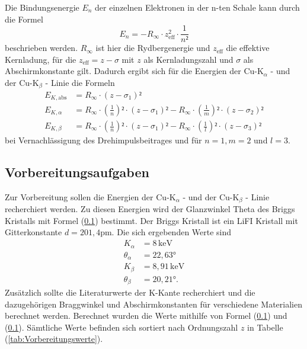 Die Bindungsenergie $E_n$ der einzelnen Elektronen in der n-ten Schale kann durch die Formel 
\begin{equation}
E_n = - R_{\infty} \cdot z^{2}_{\text{eff}} \cdot \frac{1}{n²}
\end{equation}
beschrieben werden. $R_{\infty}$ ist hier die Rydbergenergie und $z_{\text{eff}}$ die effektive Kernladung, für die $z_{\text{eff}} = z - \sigma$ mit $z$ als Kernladungszahl 
und $\sigma$ als Abschirmkonstante gilt. 
Dadurch ergibt sich für die Energien der $\text{Cu-K}_\alpha$ - und der $\text{Cu-K}_{\beta}$ - Linie die Formeln 
\begin{align}
    E_{K,\text{abs}} &= R_{\infty} \cdot \left(z - \sigma_1\right)² \label{eqn:Kupfer_Linien_Energien_abs} \\
    E_{K,\alpha} &= R_{\infty} \cdot \left(\frac{1}{n}\right)² \cdot \left(z - \sigma_1\right)² - R_{\infty} \cdot \left(\frac{1}{m}\right)² \cdot \left(z - \sigma_2\right)² \label{eqn:Kupfer_Linien_Energien_alpha}\\
    E_{K,\beta} &= R_{\infty} \cdot \left(\frac{1}{n}\right)² \cdot \left(z - \sigma_1\right)² - R_{\infty} \cdot \left(\frac{1}{l}\right)² \cdot \left(z - \sigma_3\right)² \label{eqn:Kupfer_Linien_Energien_beta}
 \end{align}
bei Vernachlässigung des Drehimpulsbeitrages und für $n = 1, m = 2$ und $l = 3$. 
\subsection{}

\subsection{Vorbereitungsaufgaben}
\label{sec:Vorbereitungsaufgaben}
Zur Vorbereitung sollen die Energien der $\text{Cu-K}_\alpha$ - und der $\text{Cu-K}_{\beta}$ - Linie recherchiert werden. Zu diesen Energien wird der Glanzwinkel 
Theta des Briggs Kristalls mit Formel (\ref{}) bestimmt. Der Briggs Kristall ist ein LiFI Kristall mit Gitterkonstante $d = 201,4 \unit{\pico\meter}$.
Die sich ergebenden Werte sind 
\begin{align*}
    K_\alpha &= 8 \, \si{\kilo\electronvolt}\\
    \theta_\alpha &= 22,63 \unit{\degree} \\
    K_\beta &= 8,91 \, \si{\kilo\electronvolt}\\
    \theta_\beta &= 20,21 \unit{\degree} .
\end{align*}
Zusätzlich sollte die Literaturwerte der K-Kante recherchiert und die dazugehörigen Braggwinkel und Abschirmkonstanten für verschiedene Materialien berechnet werden.
Berechnet wurden die Werte mithilfe von Formel (\ref{}) und (\ref{}).
Sämtliche Werte befinden sich sortiert nach Ordnungszahl $z$ in Tabelle (\ref{tab:Vorbereitungswerte}).

